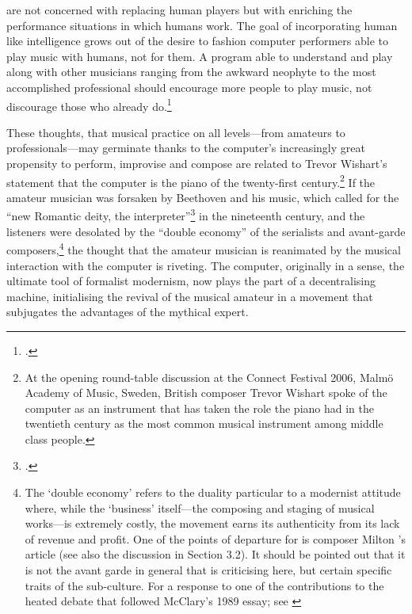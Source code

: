 \begin{squote} [they] are not concerned with replacing human players but with enriching the performance situations in which humans work. The goal of incorporating human like intelligence grows out of the desire to fashion computer performers able to play music with humans, not for them. A program able to understand and play along with other musicians ranging from the awkward neophyte to the most accomplished professional should encourage more people to play music, not discourage those who already do.\footcite[262]{rowe}
\end{squote}

These thoughts, that musical practice on all levels---from amateurs to professionals---may germinate thanks to the computer's increasingly great propensity to perform, improvise and compose are related to Trevor Wishart's statement that the computer is the piano of the twenty-first century.\footnote{At the opening round-table discussion at the Connect Festival 2006, Malm\"{o} Academy of Music, Sweden, British composer Trevor Wishart spoke of the computer as an instrument that has taken the role the piano had in the twentieth century as the most common musical instrument among middle class people.} If the amateur musician was forsaken by Beethoven and his music, which called for the ``new Romantic deity, the interpreter''\footcite[152]{barthesMus} in the nineteenth century, and the listeners were desolated by the ``double economy'' of the serialists and avant-garde composers,\footnote{The `double economy' refers to the duality particular to a modernist attitude where, while the `business' itself---the composing and staging of musical works---is extremely costly, the movement earns its authenticity from its lack of revenue and profit. One of the points of departure for \citeauthor{mcclary89} is composer Milton \citeauthor{babbitt58}'s \citeyear{babbitt58} article  (see also the discussion in Section 3.2). It should be pointed out that it is not the avant garde in general that \citeauthor{mcclary94} is criticising here, but certain specific traits of the sub-culture. \parencite[][61]{mcclary89} For a response to one of the contributions to the heated debate that followed McClary's 1989 essay; see \cite{mcclary94}}\nocite{babbitt58} the thought that the amateur musician is reanimated by the musical interaction with the computer is riveting. The computer, originally in a sense, the ultimate tool of formalist modernism, now plays the part of a decentralising machine, initialising the revival of the musical amateur in a movement that subjugates the advantages of the mythical expert.

